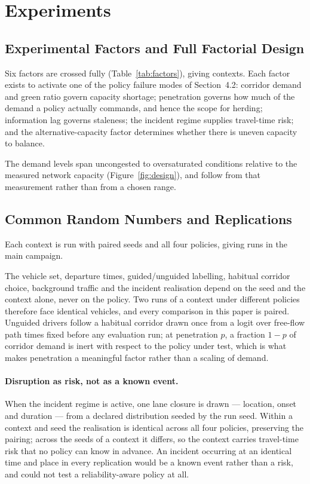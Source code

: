 \section{Experiments}

\subsection{Experimental Factors and Full Factorial Design}

Six factors are crossed fully (Table~\ref{tab:factors}), giving
\NumContexts{} contexts. Each factor exists to activate one of the policy
failure modes of Section~4.2: corridor demand and green ratio govern capacity
shortage; penetration governs how much of the demand a policy actually
commands, and hence the scope for herding; information lag governs staleness;
the incident regime supplies travel-time risk; and the alternative-capacity
factor determines whether there is uneven capacity to balance.

The demand levels span uncongested to oversaturated conditions relative to the
measured network capacity (Figure~\ref{fig:design}), and follow from that
measurement rather than from a chosen range.

\subsection{Common Random Numbers and Replications}

Each context is run with \NumSeeds{} paired seeds and all four policies, giving
\NumRunsMain{} runs in the main campaign.

The vehicle set, departure times, guided/unguided labelling, habitual corridor
choice, background traffic and the incident realisation depend on the seed and
the context alone, never on the policy. Two runs of a context under different
policies therefore face identical vehicles, and every comparison in this paper
is paired. Unguided drivers follow a habitual corridor drawn once from a logit
over free-flow path times fixed before any evaluation run; at penetration $p$, a
fraction $1-p$ of corridor demand is inert with respect to the policy under
test, which is what makes penetration a meaningful factor rather than a scaling
of demand.

\paragraph{Disruption as risk, not as a known event.} When the incident regime
is active, one lane closure is drawn --- location, onset and duration --- from a
declared distribution seeded by the run seed. Within a context and seed the
realisation is identical across all four policies, preserving the pairing;
across the seeds of a context it differs, so the context carries travel-time
risk that no policy can know in advance. An incident occurring at an identical
time and place in every replication would be a known event rather than a risk,
and could not test a reliability-aware policy at all.

